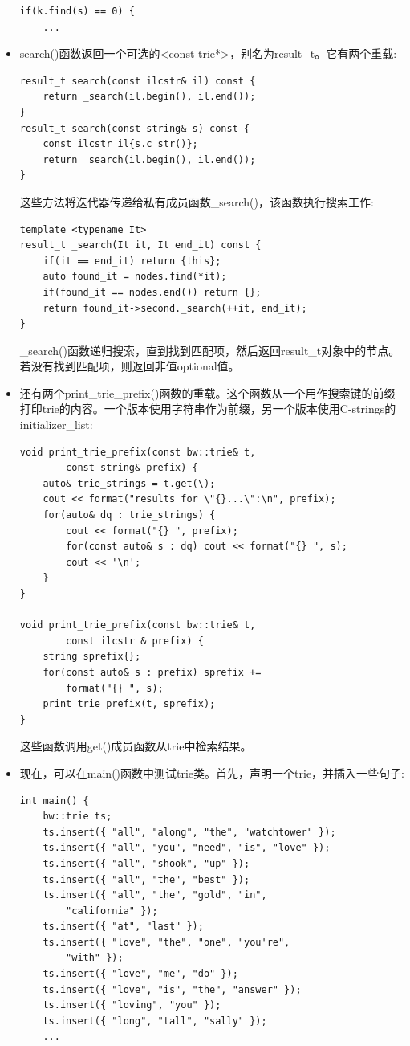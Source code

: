 \begin{itemize}
\begin{lstlisting}[style=styleCXX]
if(k.find(s) == 0) {
	...
\end{lstlisting}

\item 
search()函数返回一个可选的<const trie*>，别名为result\_t。它有两个重载:

\begin{lstlisting}[style=styleCXX]
result_t search(const ilcstr& il) const {
	return _search(il.begin(), il.end());
}
result_t search(const string& s) const {
	const ilcstr il{s.c_str()};
	return _search(il.begin(), il.end());
}
\end{lstlisting}

这些方法将迭代器传递给私有成员函数\_search()，该函数执行搜索工作:

\begin{lstlisting}[style=styleCXX]
template <typename It>
result_t _search(It it, It end_it) const {
	if(it == end_it) return {this};
	auto found_it = nodes.find(*it);
	if(found_it == nodes.end()) return {};
	return found_it->second._search(++it, end_it);
}
\end{lstlisting}

\_search()函数递归搜索，直到找到匹配项，然后返回result\_t对象中的节点。若没有找到匹配项，则返回非值optional值。

\item 
还有两个print\_trie\_prefix()函数的重载。这个函数从一个用作搜索键的前缀打印trie的内容。一个版本使用字符串作为前缀，另一个版本使用C-strings的initializer\_list:

\begin{lstlisting}[style=styleCXX]
void print_trie_prefix(const bw::trie& t,
		const string& prefix) {
	auto& trie_strings = t.get(\);
	cout << format("results for \"{}...\":\n", prefix);
	for(auto& dq : trie_strings) {
		cout << format("{} ", prefix);
		for(const auto& s : dq) cout << format("{} ", s);
		cout << '\n';
	}
}

void print_trie_prefix(const bw::trie& t,
		const ilcstr & prefix) {
	string sprefix{};
	for(const auto& s : prefix) sprefix +=
		format("{} ", s);
	print_trie_prefix(t, sprefix);
}
\end{lstlisting}

这些函数调用get()成员函数从trie中检索结果。

\item 
现在，可以在main()函数中测试trie类。首先，声明一个trie，并插入一些句子:

\begin{lstlisting}[style=styleCXX]
int main() {
	bw::trie ts;
	ts.insert({ "all", "along", "the", "watchtower" });
	ts.insert({ "all", "you", "need", "is", "love" });
	ts.insert({ "all", "shook", "up" });
	ts.insert({ "all", "the", "best" });
	ts.insert({ "all", "the", "gold", "in",
		"california" });
	ts.insert({ "at", "last" });
	ts.insert({ "love", "the", "one", "you're",
		"with" });
	ts.insert({ "love", "me", "do" });
	ts.insert({ "love", "is", "the", "answer" });
	ts.insert({ "loving", "you" });
	ts.insert({ "long", "tall", "sally" });
	...
\end{lstlisting}


\end{itemize}
